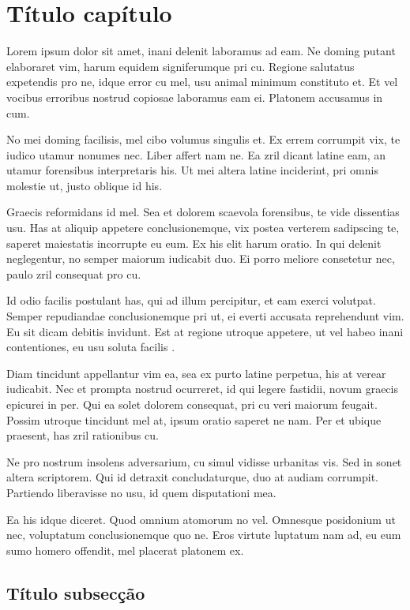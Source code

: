 % 
\section{Título capítulo}

Lorem ipsum dolor sit amet, inani delenit laboramus ad eam. Ne doming putant elaboraret vim, harum equidem signiferumque pri cu. Regione salutatus expetendis pro ne, idque error cu mel, usu animal minimum constituto et. Et vel vocibus erroribus \cite{ahmed2015scientists, HOWELL20112656} nostrud copiosae laboramus eam ei. Platonem accusamus in cum.

No mei doming facilisis, mel cibo volumus singulis et. Ex errem corrumpit vix, te iudico utamur nonumes nec. Liber affert nam ne. Ea zril dicant latine eam, an utamur forensibus interpretaris his. Ut mei altera latine inciderint, pri omnis molestie ut, justo oblique id his.

Graecis reformidans id mel. Sea et dolorem scaevola forensibus, te vide dissentias usu. Has at aliquip appetere conclusionemque, vix postea verterem sadipscing te, saperet maiestatis incorrupte eu eum. Ex his elit harum oratio. In qui delenit neglegentur, no semper maiorum iudicabit duo. Ei porro meliore consetetur nec, paulo zril consequat pro cu.

Id odio facilis postulant has, qui ad illum percipitur, et eam exerci volutpat. Semper repudiandae conclusionemque pri ut, ei everti accusata reprehendunt vim. Eu sit dicam debitis invidunt. Est at regione utroque appetere, ut vel habeo inani contentiones, eu usu soluta facilis \cite{10.1007/978-3-030-18240-3_24}.

Diam tincidunt appellantur vim ea, sea ex purto latine perpetua, his at verear iudicabit. Nec et prompta nostrud ocurreret, id qui legere fastidii, novum graecis epicurei in per. Qui ea solet dolorem consequat, pri cu veri maiorum feugait. Possim utroque tincidunt mel at, ipsum oratio saperet ne nam. Per et ubique praesent, has zril rationibus cu.

Ne pro nostrum insolens adversarium, cu simul vidisse urbanitas vis. Sed in sonet altera scriptorem. Qui id detraxit concludaturque, duo at audiam corrumpit. Partiendo liberavisse no usu, id quem disputationi mea.

Ea his idque diceret. Quod omnium atomorum no vel. Omnesque posidonium ut nec, voluptatum conclusionemque quo ne. Eros virtute luptatum nam ad, eu eum sumo homero offendit, mel placerat platonem ex.

\subsection{Título subsecção}

